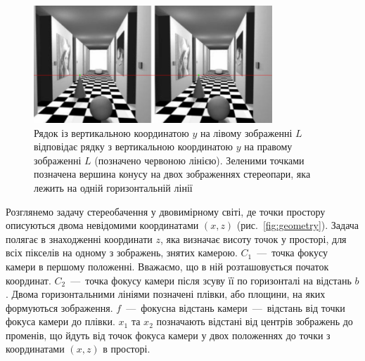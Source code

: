 \begin{figure}[h]
  \centering
  \includegraphics[width=0.8\textwidth]{images/one_line}
  \caption{Рядок із вертикальною координатою $y$
           на лівому зображенні $L$ відповідає
           рядку з вертикальною координатою $y$ на правому зображенні $L$
           (позначено червоною лінією).
           Зеленими точками позначена вершина конусу на двох зображеннях
           стереопари, яка лежить на одній горизонтальній лінії}
  \label{fig:one:line}
\end{figure}

Розглянемо задачу стереобачення у двовимірному світі,
де точки простору описуються двома невідомими координатами
$ \left( x, z \right) $ (рис.~\ref{fig:geometry}).
Задача полягає в знаходженні координати $z$,
яка визначає висоту точок у просторі,
для всіх пікселів на одному з зображень,
знятих камерою.
$C_1$~---~точка фокусу камери в першому положенні.
Вважаємо, що в ній розташовується початок координат.
$C_2$~---~точка фокусу камери після зсуву її по горизонталі на відстань $b$.
Двома горизонтальними лініями позначені плівки, або площини,
на яких формуються зображення.
$f$~---~фокусна відстань камери~---~відстань від точки фокуса камери до плівки.
$x_1$ та $x_2$ позначають відстані від центрів зображень до променів,
що йдуть від точок фокуса камери у двох положеннях до точки з координатами
$\left(x, z \right)$ в просторі.

